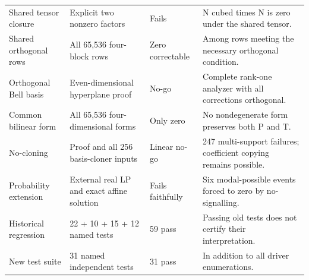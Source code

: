 \begin{longtable}{@{}L{29mm}L{53mm}L{21mm}L{45mm}@{}}
Shared tensor closure & Explicit two nonzero factors & Fails & N cubed times N is zero under the shared tensor.\\
Shared orthogonal rows & All 65,536 four-block rows & Zero correctable & Among rows meeting the necessary orthogonal condition.\\
Orthogonal Bell basis & Even-dimensional hyperplane proof & No-go & Complete rank-one analyzer with all corrections orthogonal.\\
Common bilinear form & All 65,536 four-dimensional forms & Only zero & No nondegenerate form preserves both P and T.\\
No-cloning & Proof and all 256 basis-cloner inputs & Linear no-go & 247 multi-support failures; coefficient copying remains possible.\\
Probability extension & External real LP and exact affine solution & Fails faithfully & Six modal-possible events forced to zero by no-signalling.\\
Historical regression & 22 + 10 + 15 + 12 named tests & 59 pass & Passing old tests does not certify their interpretation.\\
New test suite & 31 named independent tests & 31 pass & In addition to all driver enumerations.\\
\bottomrule\end{longtable}\normalsize
